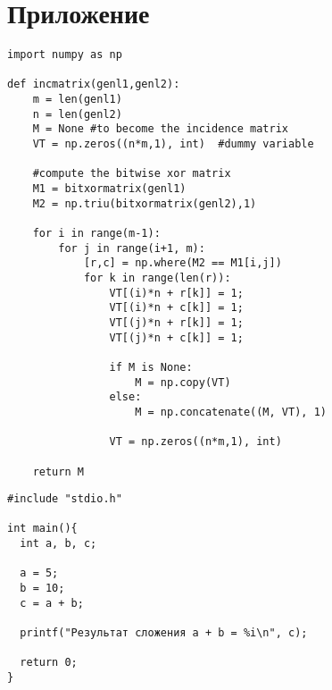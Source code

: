 \documentclass[a4paper,14pt]{extarticle}
\begin{document}
\section*{Приложение}
\begin{verbatim}
import numpy as np
 
def incmatrix(genl1,genl2):
    m = len(genl1)
    n = len(genl2)
    M = None #to become the incidence matrix
    VT = np.zeros((n*m,1), int)  #dummy variable
 
    #compute the bitwise xor matrix
    M1 = bitxormatrix(genl1)
    M2 = np.triu(bitxormatrix(genl2),1) 
 
    for i in range(m-1):
        for j in range(i+1, m):
            [r,c] = np.where(M2 == M1[i,j])
            for k in range(len(r)):
                VT[(i)*n + r[k]] = 1;
                VT[(i)*n + c[k]] = 1;
                VT[(j)*n + r[k]] = 1;
                VT[(j)*n + c[k]] = 1;
 
                if M is None:
                    M = np.copy(VT)
                else:
                    M = np.concatenate((M, VT), 1)
 
                VT = np.zeros((n*m,1), int)
 
    return M
\end{verbatim}

\begin{verbatim}
#include "stdio.h"

int main(){
  int a, b, c; 
  
  a = 5;
  b = 10;
  c = a + b;
  
  printf("Результат сложения a + b = %i\n", c);
  
  return 0;
}
\end{verbatim}
\end{document}
